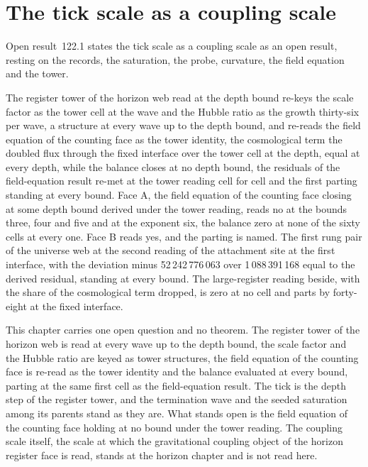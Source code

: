 \section{The tick scale as a coupling scale}\label{mod:X-10-tick-scale-as-a-coupling-scale}
\label{narr:open:10-10}Open result~122.1 states the tick scale as a coupling scale as an open result, resting on the records, the saturation, the probe, curvature, the field equation and the tower.
\begin{chwall}\label{box:X-10-tick-scale-as-a-coupling-scale:1}
The register tower of the horizon web read at the depth bound re-keys the scale factor as the tower cell at the wave and the Hubble ratio as the growth thirty-six per wave, a structure at every wave up to the depth bound, and re-reads the field equation of the counting face as the tower identity, the cosmological term the doubled flux through the fixed interface over the tower cell at the depth, equal at every depth, while the balance closes at no depth bound, the residuals of the field-equation result re-met at the tower reading cell for cell and the first parting standing at every bound. Face A, the field equation of the counting face closing at some depth bound derived under the tower reading, reads no at the bounds three, four and five and at the exponent six, the balance zero at none of the sixty cells at every one. Face B reads yes, and the parting is named. The first rung pair of the universe web at the second reading of the attachment site at the first interface, with the deviation minus 52\,242\,776\,063 over 1\,088\,391\,168 equal to the derived residual, standing at every bound. The large-register reading beside, with the share of the cosmological term dropped, is zero at no cell and parts by forty-eight at the fixed interface.
\end{chwall}
This chapter carries one open question and no theorem. The register tower of the horizon web is read at every wave up to the depth bound, the scale factor and the Hubble ratio are keyed as tower structures, the field equation of the counting face is re-read as the tower identity and the balance evaluated at every bound, parting at the same first cell as the field-equation result. The tick is the depth step of the register tower, and the termination wave and the seeded saturation among its parents stand as they are. What stands open is the field equation of the counting face holding at no bound under the tower reading. The coupling scale itself, the scale at which the gravitational coupling object of the horizon register face is read, stands at the horizon chapter and is not read here.
